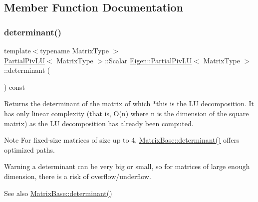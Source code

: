 \subsection{Member Function Documentation}
\mbox{\label{class_eigen_1_1_partial_piv_l_u_a54c3d39c9b46ff485a8d2140b9b23193}} 
\subsubsection{\texorpdfstring{determinant()}{determinant()}}
{\footnotesize\ttfamily template$<$typename Matrix\+Type $>$ \\
\mbox{\hyperlink{class_eigen_1_1_partial_piv_l_u}{Partial\+Piv\+LU}}$<$ Matrix\+Type $>$\+::Scalar \mbox{\hyperlink{class_eigen_1_1_partial_piv_l_u}{Eigen\+::\+Partial\+Piv\+LU}}$<$ Matrix\+Type $>$\+::determinant (\begin{DoxyParamCaption}{ }\end{DoxyParamCaption}) const}

\begin{DoxyReturn}{Returns}
the determinant of the matrix of which $\ast$this is the LU decomposition. It has only linear complexity (that is, O(n) where n is the dimension of the square matrix) as the LU decomposition has already been computed.
\end{DoxyReturn}
\begin{DoxyNote}{Note}
For fixed-\/size matrices of size up to 4, \mbox{\hyperlink{class_eigen_1_1_matrix_base_a7ad8f77004bb956b603bb43fd2e3c061}{Matrix\+Base\+::determinant()}} offers optimized paths.
\end{DoxyNote}
\begin{DoxyWarning}{Warning}
a determinant can be very big or small, so for matrices of large enough dimension, there is a risk of overflow/underflow.
\end{DoxyWarning}
\begin{DoxySeeAlso}{See also}
\mbox{\hyperlink{class_eigen_1_1_matrix_base_a7ad8f77004bb956b603bb43fd2e3c061}{Matrix\+Base\+::determinant()}} 
\end{DoxySeeAlso}
\mbox{\label{class_eigen_1_1_partial_piv_l_u_aef983470f92aba829e861e32e68681b5}} 

